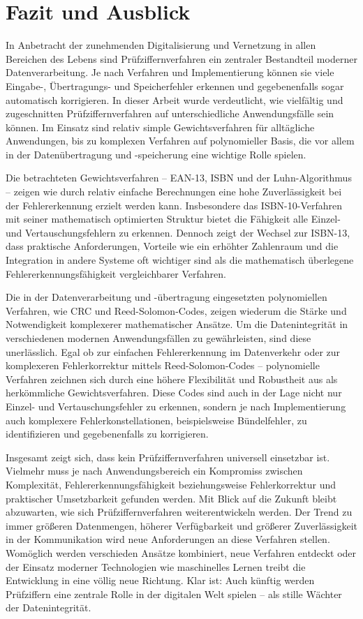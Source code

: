 
\chapter{Fazit und Ausblick} \label{chap:fazit}
In Anbetracht der zunehmenden Digitalisierung und Vernetzung in allen Bereichen des Lebens sind Prüfziffernverfahren ein zentraler Bestandteil moderner Datenverarbeitung. Je nach Verfahren und Implementierung können sie viele Eingabe-, Übertragungs- und Speicherfehler erkennen und gegebenenfalls sogar automatisch korrigieren. In dieser Arbeit wurde verdeutlicht, wie vielfältig und zugeschnitten Prüfziffernverfahren auf unterschiedliche Anwendungsfälle sein können. Im Einsatz sind relativ simple Gewichtsverfahren für alltägliche Anwendungen, bis zu komplexen Verfahren auf polynomieller Basis, die vor allem in der Datenübertragung und -speicherung eine wichtige Rolle spielen.

Die betrachteten Gewichtsverfahren – EAN-13, ISBN und der Luhn-Algorithmus – zeigen wie durch relativ einfache Berechnungen eine hohe Zuverlässigkeit bei der Fehlererkennung erzielt werden kann. Insbesondere das ISBN-10-Verfahren mit seiner mathematisch optimierten Struktur bietet die Fähigkeit alle Einzel- und Vertauschungsfehlern zu erkennen. Dennoch zeigt der Wechsel zur ISBN-13, dass praktische Anforderungen, Vorteile wie ein erhöhter Zahlenraum und die Integration in andere Systeme oft wichtiger sind als die mathematisch überlegene Fehlererkennungsfähigkeit vergleichbarer Verfahren.

Die in der Datenverarbeitung und -übertragung eingesetzten polynomiellen Verfahren, wie \ac{CRC} und Reed-Solomon-Codes, zeigen wiederum die Stärke und Notwendigkeit komplexerer mathematischer Ansätze. Um die Datenintegrität in verschiedenen modernen Anwendungsfällen zu gewährleisten, sind diese unerlässlich. Egal ob zur einfachen Fehlererkennung im Datenverkehr oder zur komplexeren Fehlerkorrektur mittels Reed-Solomon-Codes – polynomielle Verfahren zeichnen sich durch eine höhere Flexibilität und Robustheit aus als herkömmliche Gewichtsverfahren. Diese Codes sind auch in der Lage nicht nur Einzel- und Vertauschungsfehler zu erkennen, sondern je nach Implementierung auch komplexere Fehlerkonstellationen, beispielsweise Bündelfehler, zu identifizieren und gegebenenfalls zu korrigieren.

Insgesamt zeigt sich, dass kein Prüfziffernverfahren universell einsetzbar ist. Vielmehr muss je nach Anwendungsbereich ein Kompromiss zwischen Komplexität, Fehlererkennungsfähigkeit beziehungsweise Fehlerkorrektur und praktischer Umsetzbarkeit gefunden werden. Mit Blick auf die Zukunft bleibt abzuwarten, wie sich Prüfziffernverfahren weiterentwickeln werden. Der Trend zu immer größeren Datenmengen, höherer Verfügbarkeit und größerer Zuverlässigkeit in der Kommunikation wird neue Anforderungen an diese Verfahren stellen. Womöglich werden verschieden Ansätze kombiniert, neue Verfahren entdeckt oder der Einsatz moderner Technologien wie maschinelles Lernen treibt die Entwicklung in eine völlig neue Richtung. Klar ist: Auch künftig werden Prüfziffern eine zentrale Rolle in der digitalen Welt spielen – als stille Wächter der Datenintegrität.